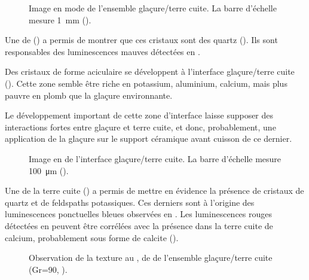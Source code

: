 \begin{figure}[htb]
  \caption[\ -- Observation de la texture au \MEB, 
           en mode \ERD. Ensemble glaçure/terre cuite]
          {\legendeB
           Image en mode \ERD de l'ensemble glaçure/terre cuite. 
           La barre d'échelle mesure \SI{1}{\mm} ().}
  \label{MEB:6529_img}
\end{figure}

Une \carto de \RX () a permis de montrer que ces cristaux sont des quartz (). Ils sont responsables des luminescences mauves détectées en \CL.

Des cristaux de forme aciculaire se développent à l'interface 
glaçure/terre cuite (). Cette zone semble être 
riche en potassium, aluminium, calcium, mais plus pauvre en plomb que 
la glaçure environnante.

Le développement important de cette zone d'interface laisse supposer 
des interactions fortes entre glaçure et terre cuite, et donc, 
probablement, une application de la glaçure sur le support céramique 
avant cuisson de ce dernier.

\begin{figure}[htb]
  \caption[\ -- Observation de la texture au \MEB, 
           en mode \ERD. Interface glaçure/terre cuite]
          {\legendeB
           Image en \ERD de l'interface glaçure/terre cuite. 
           La barre d'échelle mesure \SI{100}{\um} ().}
  \label{MEB:6529_img_int}
\end{figure}

Une \carto de la terre cuite () a permis de mettre en évidence la présence de cristaux de quartz et de feldspaths potassiques. Ces derniers sont à l'origine des luminescences ponctuelles bleues observées en \CL. Les luminescences rouges détectées en \CL peuvent être corrélées avec la présence dans la terre cuite de calcium, probablement sous forme de calcite ().

\begin{figure}[htb]
  \caption[\ -- Observation de la texture au \MEB, \carto de \RX de l'ensemble glaçure/terre cuite]
          {\legendeB
           Observation de la texture au \MEB, \carto de \RX de l'ensemble glaçure/terre cuite (Gr=90, ).}
  \label{MEB:6529_carto_tcgla}
\end{figure}

